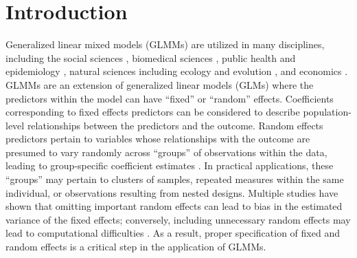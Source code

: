 \section{Introduction}
\label{sec:introduction}

Generalized linear mixed models (GLMMs) are utilized in many disciplines, including the social sciences \citep{schmidt2016random}, biomedical sciences \citep{fitzmaurice2012applied}, public health and epidemiology \citep{szyszkowicz2006use,kleinman2004generalized,dean2007generalized}, natural sciences including ecology and evolution \citep{bolker2009generalized}, and economics \citep{langford1994using}. 
GLMMs are an extension of generalized linear models (GLMs) where the predictors within the model can have ``fixed'' or ``random'' effects. Coefficients corresponding to fixed effects predictors can be considered to describe population-level relationships between the predictors and the outcome. Random effects predictors pertain to variables whose relationships with the outcome are presumed to vary randomly across ``groups'' of observations within the data, leading to group-specific coefficient estimates \citep{fitzmaurice2012applied}.
In practical applications, these ``groups'' may pertain to clusters of samples, repeated measures within the same individual, or observations resulting from nested designs.  Multiple studies have shown that omitting important random effects can lead to bias in the estimated variance of the fixed effects; conversely, including unnecessary random effects may lead to computational difficulties \citep{thompson2017bias, gurka2011avoiding, bondell2010joint}. As a result, proper specification of fixed and random effects is a critical step in the application of GLMMs.  

